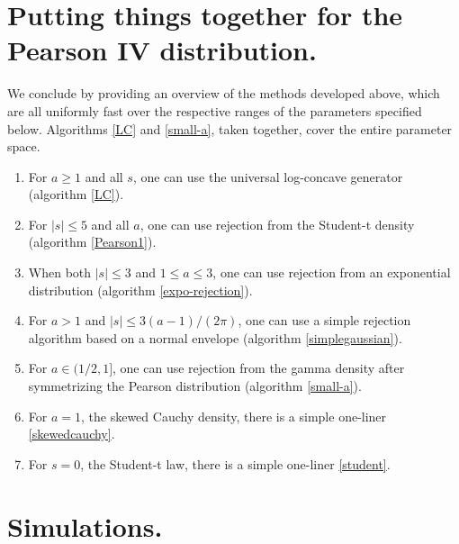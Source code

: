 \documentclass[12pt,reqno,tbtags]{amsart}
\begin{document}
\section{Putting things together for the Pearson IV distribution.}


We conclude by 
providing an overview of the methods developed above, which are all uniformly fast over the respective ranges of the parameters specified below. Algorithms \ref{LC} and \ref{small-a}, taken together, cover the entire parameter space.


\begin{enumerate}
\item[(i)] For $a \ge 1$ and all $s$, one can use the universal log-concave generator (algorithm \ref{LC}).
\item[(ii)] For $|s| \le 5$ and all $a$, one can use rejection from the Student-t density (algorithm \ref{Pearson1}). 
\item[(iii)] When both $|s|\le 3$ and $1 \le a \le 3$, one can use rejection from an exponential distribution (algorithm \ref{expo-rejection}). 
\item[(iv)] For $a >1$ and $|s| \le 3 (a-1)/ (2 \pi)$, one can use a simple rejection algorithm based on a normal envelope (algorithm \ref{simplegaussian}).
\item[(v)] For $a \in (1/2, 1]$, one can use rejection from the gamma density after symmetrizing the Pearson distribution (algorithm \ref{small-a}).
\item[(vi)] For $a = 1$, the skewed Cauchy density, there is a simple one-liner \eqref{skewedcauchy}.
\item[(vii)] For $s = 0$, the Student-t law, there is a simple one-liner \eqref{student}.
\end{enumerate}



\section{Simulations.} 
\end{document}
